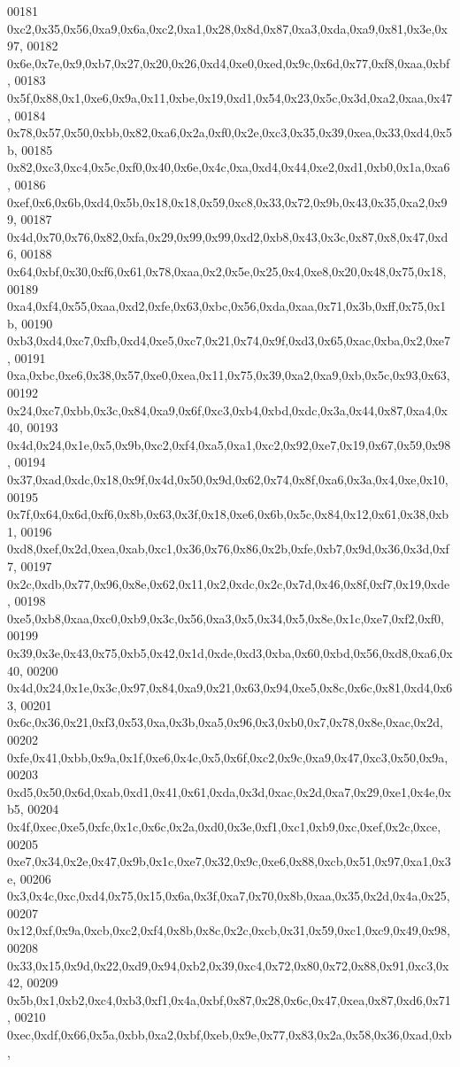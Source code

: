 \begin{DoxyCode}
00181   0xc2,0x35,0x56,0xa9,0x6a,0xc2,0xa1,0x28,0x8d,0x87,0xa3,0xda,0xa9,0x81,0x3e,0x97,
00182   0x6e,0x7e,0x9,0xb7,0x27,0x20,0x26,0xd4,0xe0,0xed,0x9c,0x6d,0x77,0xf8,0xaa,0xbf,
00183   0x5f,0x88,0x1,0xe6,0x9a,0x11,0xbe,0x19,0xd1,0x54,0x23,0x5c,0x3d,0xa2,0xaa,0x47,
00184   0x78,0x57,0x50,0xbb,0x82,0xa6,0x2a,0xf0,0x2e,0xc3,0x35,0x39,0xea,0x33,0xd4,0x5b,
00185   0x82,0xc3,0xc4,0x5c,0xf0,0x40,0x6e,0x4c,0xa,0xd4,0x44,0xe2,0xd1,0xb0,0x1a,0xa6,
00186   0xef,0x6,0x6b,0xd4,0x5b,0x18,0x18,0x59,0xc8,0x33,0x72,0x9b,0x43,0x35,0xa2,0x99,
00187   0x4d,0x70,0x76,0x82,0xfa,0x29,0x99,0x99,0xd2,0xb8,0x43,0x3c,0x87,0x8,0x47,0xd6,
00188   0x64,0xbf,0x30,0xf6,0x61,0x78,0xaa,0x2,0x5e,0x25,0x4,0xe8,0x20,0x48,0x75,0x18,
00189   0xa4,0xf4,0x55,0xaa,0xd2,0xfe,0x63,0xbc,0x56,0xda,0xaa,0x71,0x3b,0xff,0x75,0x1b,
00190   0xb3,0xd4,0xc7,0xfb,0xd4,0xe5,0xc7,0x21,0x74,0x9f,0xd3,0x65,0xac,0xba,0x2,0xe7,
00191   0xa,0xbc,0xe6,0x38,0x57,0xe0,0xea,0x11,0x75,0x39,0xa2,0xa9,0xb,0x5c,0x93,0x63,
00192   0x24,0xc7,0xbb,0x3c,0x84,0xa9,0x6f,0xc3,0xb4,0xbd,0xdc,0x3a,0x44,0x87,0xa4,0x40,
00193   0x4d,0x24,0x1e,0x5,0x9b,0xc2,0xf4,0xa5,0xa1,0xc2,0x92,0xe7,0x19,0x67,0x59,0x98,
00194   0x37,0xad,0xdc,0x18,0x9f,0x4d,0x50,0x9d,0x62,0x74,0x8f,0xa6,0x3a,0x4,0xe,0x10,
00195   0x7f,0x64,0x6d,0xf6,0x8b,0x63,0x3f,0x18,0xe6,0x6b,0x5c,0x84,0x12,0x61,0x38,0xb1,
00196   0xd8,0xef,0x2d,0xea,0xab,0xc1,0x36,0x76,0x86,0x2b,0xfe,0xb7,0x9d,0x36,0x3d,0xf7,
00197   0x2c,0xdb,0x77,0x96,0x8e,0x62,0x11,0x2,0xdc,0x2c,0x7d,0x46,0x8f,0xf7,0x19,0xde,
00198   0xe5,0xb8,0xaa,0xc0,0xb9,0x3c,0x56,0xa3,0x5,0x34,0x5,0x8e,0x1c,0xe7,0xf2,0xf0,
00199   0x39,0x3e,0x43,0x75,0xb5,0x42,0x1d,0xde,0xd3,0xba,0x60,0xbd,0x56,0xd8,0xa6,0x40,
00200   0x4d,0x24,0x1e,0x3c,0x97,0x84,0xa9,0x21,0x63,0x94,0xe5,0x8c,0x6c,0x81,0xd4,0x63,
00201   0x6c,0x36,0x21,0xf3,0x53,0xa,0x3b,0xa5,0x96,0x3,0xb0,0x7,0x78,0x8e,0xac,0x2d,
00202   0xfe,0x41,0xbb,0x9a,0x1f,0xe6,0x4c,0x5,0x6f,0xc2,0x9c,0xa9,0x47,0xc3,0x50,0x9a,
00203   0xd5,0x50,0x6d,0xab,0xd1,0x41,0x61,0xda,0x3d,0xac,0x2d,0xa7,0x29,0xe1,0x4e,0xb5,
00204   0x4f,0xec,0xe5,0xfc,0x1c,0x6c,0x2a,0xd0,0x3e,0xf1,0xc1,0xb9,0xc,0xef,0x2c,0xce,
00205   0xe7,0x34,0x2e,0x47,0x9b,0x1c,0xe7,0x32,0x9c,0xe6,0x88,0xcb,0x51,0x97,0xa1,0x3e,
00206   0x3,0x4c,0xc,0xd4,0x75,0x15,0x6a,0x3f,0xa7,0x70,0x8b,0xaa,0x35,0x2d,0x4a,0x25,
00207   0x12,0xf,0x9a,0xcb,0xc2,0xf4,0x8b,0x8c,0x2c,0xcb,0x31,0x59,0xc1,0xc9,0x49,0x98,
00208   0x33,0x15,0x9d,0x22,0xd9,0x94,0xb2,0x39,0xc4,0x72,0x80,0x72,0x88,0x91,0xc3,0x42,
00209   0x5b,0x1,0xb2,0xc4,0xb3,0xf1,0x4a,0xbf,0x87,0x28,0x6c,0x47,0xea,0x87,0xd6,0x71,
00210   0xec,0xdf,0x66,0x5a,0xbb,0xa2,0xbf,0xeb,0x9e,0x77,0x83,0x2a,0x58,0x36,0xad,0xb,

\end{DoxyCode}
